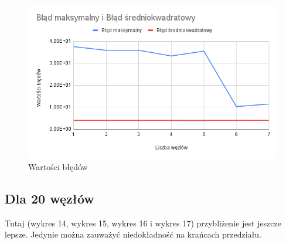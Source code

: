 \documentclass{article}
\begin{document}
\begin{figure}[H]
  \centering
  \begin{minipage}[b]{0.4\textwidth}
    \includegraphics[width=\textwidth]{img13.png}
    \caption{Wartości błędów}
  \end{minipage}
\end{figure}

\newpage

\subsection{Dla 20 węzłów}

\noindent
Tutaj (wykres 14, wykres 15, wykres 16 i wykres 17) przybliżenie jest jeszcze lepsze. Jedynie można zauważyć niedokładność na krańcach przedziału.
\end{document}
